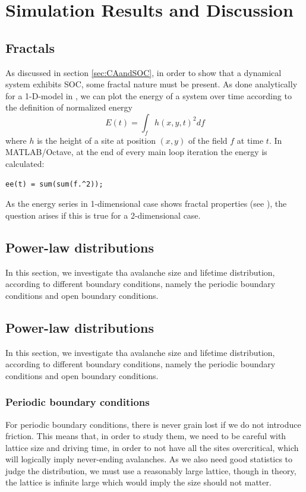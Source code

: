 \chapter{Simulation Results and Discussion}
\thispagestyle{fancy}

\section{Fractals}
As discussed in section \ref{sec:CAandSOC}, in order to show that a dynamical system exhibits SOC, some fractal nature must be present. As done analytically for a 1-D-model in \cite{fractal_avalanching}, we can plot the energy of a system over time according to the definition of normalized energy
\[
E(t) = \int_f h(x,y,t)^2 df
\]
where $h$ is the height of a site at position $(x,y)$ of the field $f$ at time $t$. In MATLAB/Octave, at the end of every main loop iteration the energy is calculated:
\begin{lstlisting}
ee(t) = sum(sum(f.^2));
\end{lstlisting}
As the energy series in 1-dimensional case shows fractal properties (see \cite{fractal_avalanching}), the question arises if this is true for a 2-dimensional case.

\section{Power-law distributions}

In this section, we investigate tha avalanche size and lifetime distribution, 
according to different boundary conditions, namely the periodic boundary conditions and open boundary conditions.



\section{Power-law distributions}

In this section, we investigate tha avalanche size and lifetime distribution, 
according to different boundary conditions, namely the periodic boundary conditions and open boundary conditions.



\subsection{Periodic boundary conditions}

For periodic boundary conditions, there is never grain lost if we do not introduce friction. 
This means that, in order to study them, we need to be careful with lattice size and driving time, 
in order to not have all the sites overcritical, which will logically imply never-ending avalanches.
As we  also need good statistics to judge the distribution, we must use a reasonably large lattice, 
though in theory, the lattice is infinite large which would imply the size should not matter.

